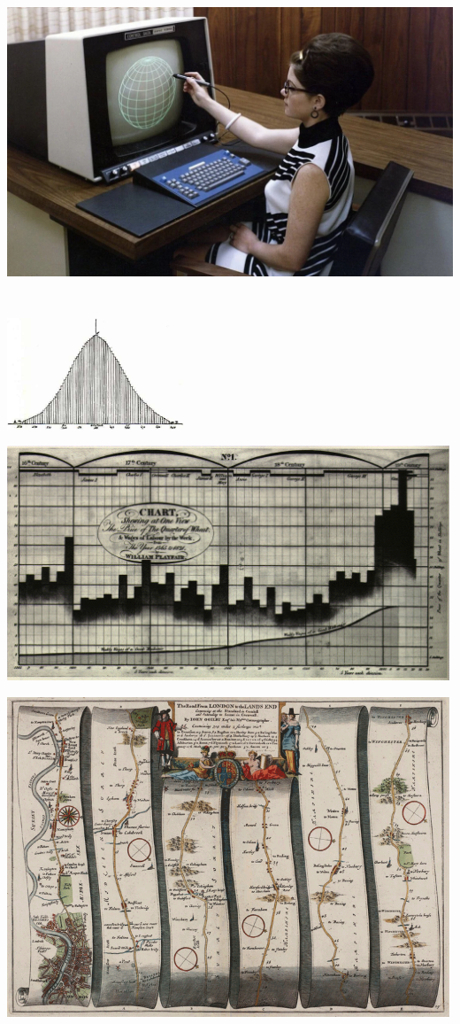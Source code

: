 \documentclass[
  letterpaper,
  DIV=11,
  numbers=noendperiod]{scrartcl}
\begin{document}
\includegraphics[width=\textwidth,height=3.75in]{images/1970s_computer_graphics.png}

\includegraphics[width=2.08333in,height=\textheight]{images/binomial-quetelet-1846.jpg}

\includegraphics[width=5.20833in,height=\textheight]{images/Playfair_1821.png}

\includegraphics[width=5.20833in,height=\textheight]{images/1675-Ogilby-The_Road_From_LONDON_to_the_LANDS_END.png}
\end{document}
